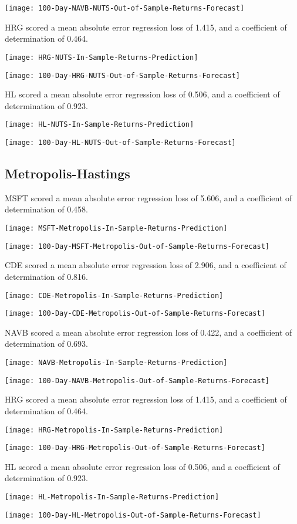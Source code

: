 \texttt{[image: 100-Day-NAVB-NUTS-Out-of-Sample-Returns-Forecast]}

HRG scored a mean absolute error regression loss of 1.415, and a coefficient of determination of 0.464.

\texttt{[image: HRG-NUTS-In-Sample-Returns-Prediction]}

\texttt{[image: 100-Day-HRG-NUTS-Out-of-Sample-Returns-Forecast]}

HL scored a mean absolute error regression loss of 0.506, and a coefficient of determination of 0.923.

\texttt{[image: HL-NUTS-In-Sample-Returns-Prediction]}

\texttt{[image: 100-Day-HL-NUTS-Out-of-Sample-Returns-Forecast]}

\subsection{Metropolis-Hastings}
MSFT scored a mean absolute error regression loss of 5.606, and a coefficient of determination of 0.458.

\texttt{[image: MSFT-Metropolis-In-Sample-Returns-Prediction]}

\texttt{[image: 100-Day-MSFT-Metropolis-Out-of-Sample-Returns-Forecast]}

CDE scored a mean absolute error regression loss of 2.906, and a coefficient of determination of 0.816.

\texttt{[image: CDE-Metropolis-In-Sample-Returns-Prediction]}

\texttt{[image: 100-Day-CDE-Metropolis-Out-of-Sample-Returns-Forecast]}

NAVB scored a mean absolute error regression loss of 0.422, and a coefficient of determination of 0.693.

\texttt{[image: NAVB-Metropolis-In-Sample-Returns-Prediction]}

\texttt{[image: 100-Day-NAVB-Metropolis-Out-of-Sample-Returns-Forecast]}

HRG scored a mean absolute error regression loss of 1.415, and a coefficient of determination of 0.464.

\texttt{[image: HRG-Metropolis-In-Sample-Returns-Prediction]}

\texttt{[image: 100-Day-HRG-Metropolis-Out-of-Sample-Returns-Forecast]}

HL scored a mean absolute error regression loss of 0.506, and a coefficient of determination of 0.923.

\texttt{[image: HL-Metropolis-In-Sample-Returns-Prediction]}

\texttt{[image: 100-Day-HL-Metropolis-Out-of-Sample-Returns-Forecast]}
